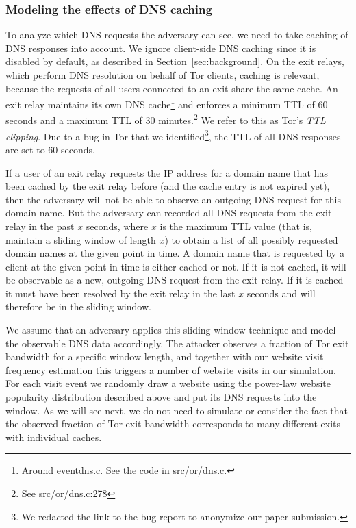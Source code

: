 \subsubsection{Modeling the effects of DNS caching}
To analyze which DNS requests the adversary can see, we need to
take caching of DNS responses into account. We ignore client-side DNS
caching since it is disabled by default, as described in
Section~\ref{sec:background}.
On the exit relays, which perform DNS resolution on behalf of Tor clients, caching
is relevant, because the requests of all users connected to an exit
share the same cache. An exit
relay maintains its own DNS cache\footnote{Around eventdns.c.  See the
		code in src/or/dns.c.} and enforces a minimum TTL of 60 seconds
and a maximum TTL of 30 minutes.\footnote{See src/or/dns.c:278}  We
refer to this as Tor's \emph{TTL clipping}. Due to a
bug in Tor that we identified\footnote{We redacted the link to the bug report to anonymize our paper
submission.},
the TTL of all DNS responses are set to 60 seconds.

If a user of an exit relay requests the IP address for a domain name
that has been cached by the exit relay before (and the cache entry is
not expired yet), then the adversary will not be able to observe an
outgoing DNS request for this domain name. But the adversary can
recorded all DNS requests from the exit relay in the past $x$ seconds,
where $x$ is the maximum TTL value (that is, maintain a sliding window of
length $x$) to obtain a list of all possibly requested domain names at the
given point in time. A domain name that is requested by a client at the
given point in time is either cached or not. If it is
not cached, it will be observable as a new, outgoing DNS
request from the exit relay. If it is cached it must
have been resolved by the exit relay in the last $x$ seconds and will
therefore be in the sliding window.

We assume that an adversary applies this sliding window technique and
model the observable DNS data accordingly.
The attacker observes a fraction of Tor exit bandwidth
for a specific window length,
and together with our website visit frequency estimation
this triggers a number of website visits in our simulation.
For each visit event we randomly draw a website using the
power-law website popularity distribution described above and put its
DNS requests into the window. As we will see next, we do not need to
simulate or consider the fact that the observed fraction of Tor exit bandwidth
corresponds to many different exits with individual caches.

